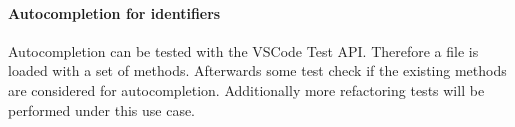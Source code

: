 \paragraph{Autocompletion for identifiers}
Autocompletion can be tested with the VSCode Test API. Therefore a file is loaded with a set of methods. Afterwards some test check if the existing methods are considered for autocompletion. Additionally more refactoring tests will be performed under this use case. 
